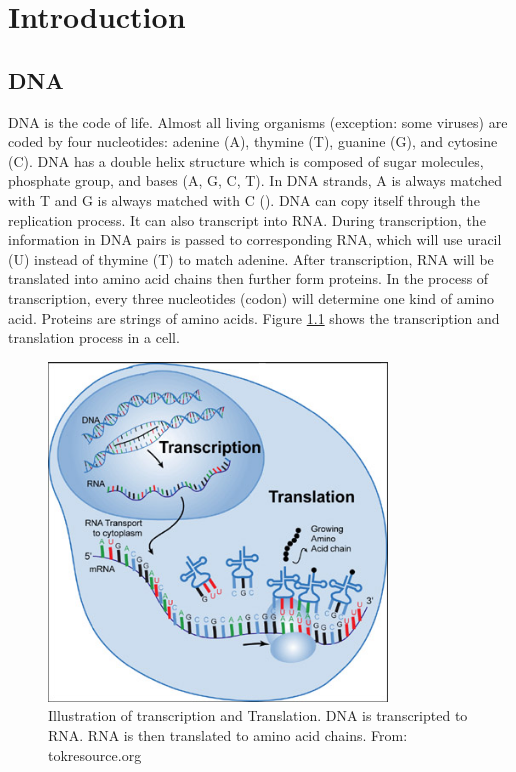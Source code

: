 \chapter{Introduction \label{chap_1}}

\section{DNA}
DNA is the code of life. Almost all living organisms (exception: some viruses) are coded by four nucleotides: adenine (A), thymine (T), guanine (G), and cytosine (C). DNA has a double helix structure which is composed of sugar molecules, phosphate group, and bases (A, G, C, T). In DNA strands, A is always matched with T and G is always matched with C (\cite{jones2004introduction}).
DNA can copy itself through the replication process. It can also transcript into RNA. During transcription, the information in DNA pairs is passed 
to corresponding RNA, which will use uracil (U) instead of thymine (T) to match adenine. After transcription, RNA will be translated into amino acid chains then further form proteins. In the process of transcription, every three nucleotides (codon) will determine one kind of amino acid. Proteins are strings of amino acids. Figure \ref{fig_trans_trans} shows the transcription and translation process in a cell. 
\begin{figure}[!h]
\begin{center}
\includegraphics[height = 9cm, width = 9cm]{img/transcp_transla.jpg}
\caption[Illustration of transcription and Translation]{Illustration of transcription and Translation. DNA is transcripted to RNA. RNA is then translated to amino acid chains. From: tokresource.org\label{fig_trans_trans}}
\end{center}
\end{figure}

